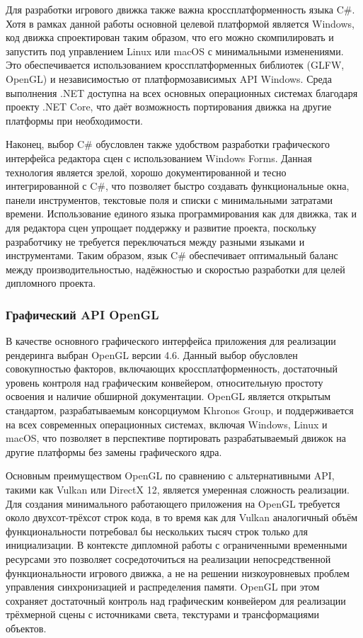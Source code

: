Для разработки игрового движка также важна кроссплатформенность языка C\#. Хотя в рамках данной работы основной целевой платформой является Windows, код движка спроектирован таким образом, что его можно скомпилировать и запустить под управлением Linux или macOS с минимальными изменениями. Это обеспечивается использованием кроссплатформенных библиотек (GLFW, OpenGL) и независимостью от платформозависимых API Windows. Среда выполнения .NET доступна на всех основных операционных системах благодаря проекту .NET Core, что даёт возможность портирования движка на другие платформы при необходимости.

Наконец, выбор C\# обусловлен также удобством разработки графического интерфейса редактора сцен с использованием Windows Forms. Данная технология является зрелой, хорошо документированной и тесно интегрированной с C\#, что позволяет быстро создавать функциональные окна, панели инструментов, текстовые поля и списки с минимальными затратами времени. Использование единого языка программирования как для движка, так и для редактора сцен упрощает поддержку и развитие проекта, поскольку разработчику не требуется переключаться между разными языками и инструментами. Таким образом, язык C\# обеспечивает оптимальный баланс между производительностью, надёжностью и скоростью разработки для целей дипломного проекта.

\subsubsection{Графический API OpenGL}
В качестве основного графического интерфейса приложения для реализации рендеринга выбран OpenGL версии 4.6. Данный выбор обусловлен совокупностью факторов, включающих кроссплатформенность, достаточный уровень контроля над графическим конвейером, относительную простоту освоения и наличие обширной документации. OpenGL является открытым стандартом, разрабатываемым консорциумом Khronos Group, и поддерживается на всех современных операционных системах, включая Windows, Linux и macOS, что позволяет в перспективе портировать разрабатываемый движок на другие платформы без замены графического ядра.

Основным преимуществом OpenGL по сравнению с альтернативными API, такими как Vulkan или DirectX 12, является умеренная сложность реализации. Для создания минимального работающего приложения на OpenGL требуется около двухсот-трёхсот строк кода, в то время как для Vulkan аналогичный объём функциональности потребовал бы нескольких тысяч строк только для инициализации. В контексте дипломной работы с ограниченными временными ресурсами это позволяет сосредоточиться на реализации непосредственной функциональности игрового движка, а не на решении низкоуровневых проблем управления синхронизацией и распределения памяти. OpenGL при этом сохраняет достаточный контроль над графическим конвейером для реализации трёхмерной сцены с источниками света, текстурами и трансформациями объектов.

